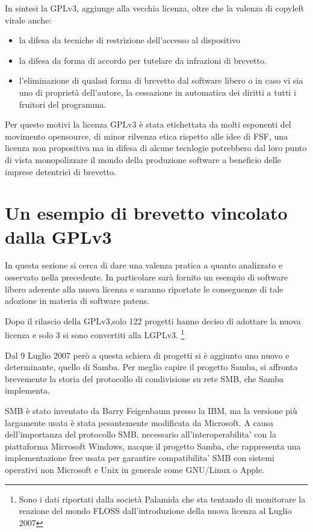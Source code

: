 In sintesi la GPLv3, aggiunge alla vecchia licenza, oltre che la valenza di copyleft virale anche:

\begin{itemize}
	\item  la difesa da tecniche di restrizione dell'accesso al dispositivo
	\item  la difesa da forma di accordo per tutelare da infrazioni di brevetto.
	\item  l'eliminazione di qualasi forma di brevetto dal software libero o in caso vi sia uno di proprietà dell'autore, la cessazione in automatica dei diritti a tutti i fruitori del programma.
\end{itemize}

Per questo motivi la licenza GPLv3 è stata etichettata da molti esponenti del movimento opensource, di minor rilvenza etica rispetto alle idee di FSF, una licenza non propositiva ma in difesa di alcune tecnlogie potrebbero dal loro punto di vista monopolizzare il mondo della produzione software a beneficio delle imprese detentrici di brevetto.





\section{Un esempio di brevetto vincolato dalla GPLv3}

In questa sezione si cerca di dare una valenza pratica a quanto analizzato e osservato nella precedente. In particolare sarà fornito un esempio di software libero aderente alla nuova licenza e saranno riportate le conseguenze di tale adozione in materia di software patens.

Dopo il rilascio della GPLv3,solo 122 progetti hanno deciso di adottare la nuova licenza e solo 3 si sono convertiti alla LGPLv3. \footnote{Sono i dati riportati dalla società Palamida che sta tentando di monitorare la reazione del mondo FLOSS dall’introduzione della nuova licenza al Luglio 2007}


Dal 9 Luglio 2007 però a questa schiera di progetti si è aggiunto uno nuovo e determinante, quello di Samba. Per meglio capire il progetto Samba, si affronta brevemente la storia del protocollo di condivisione su rete SMB, che Samba implementa.

SMB è stato inventato da Barry Feigenbaum presso la IBM, ma la versione più largamente usata è stata pesantemente modificata da Microsoft. A causa dell'importanza del protocollo SMB, necessario all'interoperabilita' con la piattaforma Microsoft Windows, nacque il progetto Samba, che rappresenta una implementazione free usata per garantire compatibilita' SMB con sistemi operativi non Microsoft e Unix in generale come GNU/Linux o Apple.

